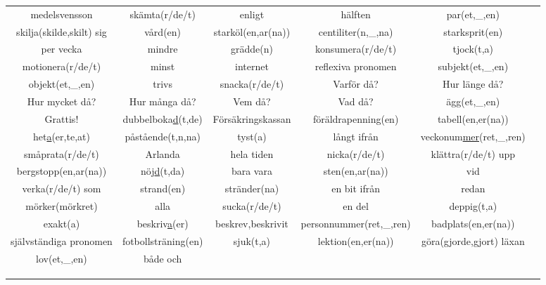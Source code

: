 
\begin{center}
    \begin{adjustwidth}{-2.5cm}{}
        \begin{tabular}{|c c c c c c|}
            \hline
            medelsvensson & skämta(r/de/t) & enligt & hälften & par(et,\_,en) &  \\
            skilja(skilde,skilt) sig & vård(en) & starköl(en,ar(na)) & centiliter(n,\_,na) & starksprit(en) &  \\
            per vecka & mindre & grädde(n) & konsumera(r/de/t) & tjock(t,a) &  \\
            motionera(r/de/t) & minst & internet & reflexiva pronomen & subjekt(et,\_,en) &  \\
            objekt(et,\_,en) & trivs & snacka(r/de/t) & Varför då? & Hur länge då? &  \\
            Hur mycket då? & Hur många då? & Vem då? & Vad då? & ägg(et,\_,en) &  \\
            Grattis! & dubbelboka\underline{d}(t,de) & Försäkringskassan & föräldrapenning(en) & tabell(en,er(na)) &  \\
            het\underline{a}(er,te,at) & påstående(t,n,na) & tyst(a) & långt ifrån & veckonum\underline{mer}(ret,\_,ren) &  \\
            småprata(r/de/t) & Arlanda & hela tiden & nicka(r/de/t) & klättra(r/de/t) upp &  \\
            bergstopp(en,ar(na)) & nöj\underline{d}(t,da) & bara vara & sten(en,ar(na)) & vid &  \\
            verka(r/de/t) som & strand(en) & stränder(na) & en bit ifrån & redan &  \\
            mörker(mörkret) & alla & sucka(r/de/t) & en del & deppig(t,a) &  \\
            exakt(a) & beskriv\underline{a}(er) & beskrev,beskrivit & personnummer(ret,\_,ren) & badplats(en,er(na)) &  \\
            självständiga pronomen & fotbollsträning(en) & sjuk(t,a) & lektion(en,er(na)) & göra(gjorde,gjort) läxan &  \\
            lov(et,\_,en) & både och &  &  &  &  \\
             &  &  &  &  &  \\
             &  &  &  &  &  \\
             &  &  &  &  &  \\

\end{tabular}
\end{adjustwidth}
\end{center}
